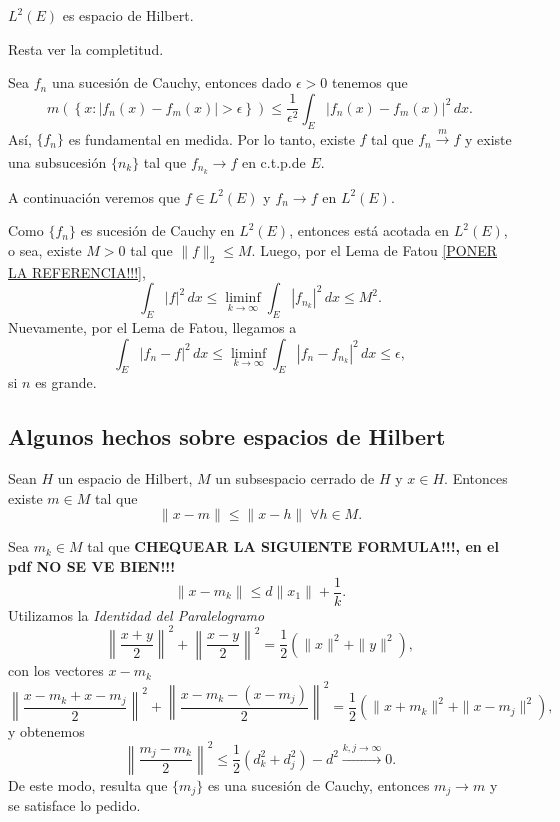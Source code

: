 \begin{teorema}{}
$L^2(E)$ es espacio de Hilbert.
\end{teorema}

\begin{demo}{}
Resta ver la completitud. 

Sea $f_n$ una sucesi\'on de Cauchy, entonces 
dado $\epsilon>0$ tenemos que 
\[
m\left(\left\{x: |f_n(x)-f_m(x)|>\epsilon \right\} \right)
\leq \frac{1}{\epsilon^2} \int_E |f_n(x)-f_m(x)|^2\,dx.
\]
As\'i, $\{f_n\}$ es fundamental en medida. Por lo tanto, 
existe $f$ tal que $f_n \xrightarrow[]{m} f$ y 
existe una subsucesi\'on $\{n_k\}$ tal que $f_{n_k}\to f$ en c.t.p.de $E$.

A continuaci\'on veremos  que $f \in L^2(E)$ y $f_n \to f$ en $L^2(E)$.

Como $\{f_n\}$ es sucesi\'on de Cauchy en $L^2(E)$, entonces est\'a acotada en $L^2(E)$, o sea, existe $M>0$ tal que $\|f\|_2\leq M$. 
Luego, por el Lema de Fatou \ref{PONER LA REFERENCIA!!!}, 
\[
\int_E |f|^2\,dx\leq \liminf\limits_{k \to \infty} \int_E |f_{n_k}|^2\,dx \leq M^2.
\]
Nuevamente, por el Lema de Fatou, llegamos a 
\[
\int_E |f_n-f|^2\,dx\leq \liminf\limits_{k \to \infty} \int_E |f_n-f_{n_k}|^2\,dx \leq \epsilon,
\]
si $n$ es grande.
\end{demo}

\subsection{Algunos hechos sobre espacios de Hilbert}

\begin{teorema}{}\label{teo:existe-proyeccion-sobre-H}
Sean $H$ un espacio de Hilbert,  $M$ un subsespacio cerrado de $H$ y  $x \in H$. Entonces existe $m \in M$ tal que 
\[
\|x-m\| \leq \|x-h\|\; \forall h \in M.
\]
\end{teorema}

\begin{demo}
Sea $m_k \in M$ tal que   \textbf{CHEQUEAR LA SIGUIENTE FORMULA!!!, en el pdf NO SE VE BIEN!!!}
\[ \|x-m_k\| \leq  d\|x_1\|+\frac{1}{k}. \]
Utilizamos la \emph{Identidad del Paralelogramo}
\[ 
\left\| \frac{x+y}{2} \right\|^2 +\left\| \frac{x-y}{2} \right\|^2
= \frac{1}{2}\left(\| x \|^2+ \|y\|^2  \right), 
\]
con los vectores $x-m_k$
\[ 
\left\| \frac{x-m_k+x-m_j}{2} \right\|^2 +\left\| \frac{x-m_k-(x-m_j)}{2} \right\|^2
= \frac{1}{2}\left(\| x+m_k \|^2+ \|x-m_j\|^2  \right), 
\]
y obtenemos
\[
\left\| \frac{m_j-m_k}{2} \right\|^2 \leq \frac{1}{2} \left(d_k^2 +d_j^2\right)-d^2
\xrightarrow[]{k,j \to \infty}0.
\]
De este modo, resulta que $\{m_j\}$ es una sucesi\'on de Cauchy, entonces $m_j \to m$ 
y se satisface lo pedido.
\end{demo}

